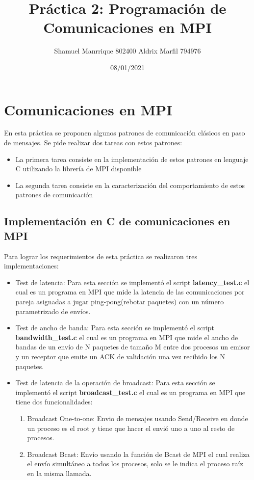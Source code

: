 \documentclass[
]{article}
\title{Práctica 2: Programación de Comunicaciones en MPI}
\author{Shamuel Manrrique 802400 \n Aldrix Marfil 794976}
\date{08/01/2021}
\begin{document}
\maketitle

\hypertarget{comunicaciones-en-mpi}{%
\section{Comunicaciones en MPI}\label{comunicaciones-en-mpi}}

En esta práctica se proponen algunos patrones de comunicación clásicos
en paso de mensajes. Se pide realizar dos tareas con estos patrones:

\begin{itemize}
\item
  La primera tarea consiste en la implementación de estos patrones en
  lenguaje C utilizando la librería de MPI disponible
\item
  La segunda tarea consiste en la caracterización del comportamiento de
  estos patrones de comunicación
\end{itemize}

\hypertarget{implementaciuxf3n-en-c-de-comunicaciones-en-mpi}{%
\subsection{Implementación en C de comunicaciones en
MPI}\label{implementaciuxf3n-en-c-de-comunicaciones-en-mpi}}

Para lograr los requerimientos de esta práctica se realizaron tres
implementaciones:

\begin{itemize}
\item
  Test de latencia: Para esta sección se implementó el script
  \textbf{latency\_test.c} el cual es un programa en MPI que mide la
  latencia de las comunicaciones por pareja asignadas a jugar
  ping-pong(rebotar paquetes) con un número parametrizado de envíos.
\item
  Test de ancho de banda: Para esta sección se implementó el script
  \textbf{bandwidth\_test.c} el cual es un programa en MPI que mide el
  ancho de bandas de un envío de N paquetes de tamaño M entre dos
  procesos un emisor y un receptor que emite un ACK de validación una
  vez recibido los N paquetes.
\item
  Test de latencia de la operación de broadcast: Para esta sección se
  implementó el script \textbf{broadcast\_test.c} el cual es un programa
  en MPI que tiene dos funcionalidades:

  \begin{enumerate}
  \def\labelenumi{\arabic{enumi}.}
  \item
    Broadcast One-to-one: Envio de mensajes usando Send/Receive en donde
    un proceso es el root y tiene que hacer el envió uno a uno al resto
    de procesos.
  \item
    Broadcast Bcast: Envío usando la función de Bcast de MPI el cual
    realiza el envío simultáneo a todos los procesos, solo se le indica
    el proceso raíz en la misma llamada.
  \end{enumerate}
\end{itemize}
\end{document}
